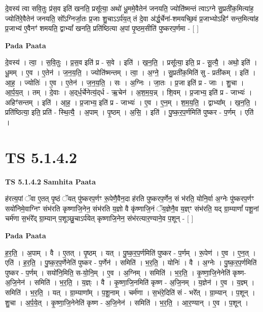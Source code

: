\documentclass[17pt]{extarticle}
\begin{document}
दे॒वस्य॑ त्वा सवि॒तुः प्र॑स॒व इति॑ खनति॒ प्रसू᳚त्या॒ अथो॑ धू॒ममे॒वैतेन॑ जनयति॒ ज्योति॑ष्मन्तं त्वाऽग्ने सु॒प्रती॑क॒मित्या॑ह॒ ज्योति॑रे॒वैतेन॑ जनयति॒ सो᳚ऽग्निर्जा॒तः प्र॒जाः शु॒चाऽऽर्प॑य॒त् तं दे॒वा अ॑र्द्ध॒र्चेना॑-शमयच्छि॒वं प्र॒जाभ्योऽहिꣳ॑ सन्त॒मित्या॑ह प्र॒जाभ्य॑ ए॒वैनꣳ॑ शमयति॒ द्वाभ्यां᳚ खनति॒ प्रति॑ष्ठित्या अ॒पां पृ॒ष्ठम॒सीति॑ पुष्करप॒र्णमा - [  ] \newline

\textbf{Pada Paata} \newline

दे॒वस्य॑ । त्वा॒ । स॒वि॒तुः । प्र॒स॒व इति॑ प्र - स॒वे । इति॑ । ख॒न॒ति॒ । प्रसू᳚त्या॒ इति॒ प्र - सू॒त्यै॒ । अथो॒ इति॑ । धू॒मम् । ए॒व । ए॒तेन॑ । ज॒न॒य॒ति॒ । ज्योति॑ष्मन्तम् । त्वा॒ । अ॒ग्ने॒ । सु॒प्रती॑क॒मिति॑ सु - प्रती॑कम् । इति॑ । आ॒ह॒ । ज्योतिः॑ । ए॒व । ए॒तेन॑ । ज॒न॒य॒ति॒ । सः । अ॒ग्निः । जा॒तः । प्र॒जा इति॑ प्र - जाः । शु॒चा । आ॒र्प॒य॒त् । तम् । दे॒वाः । अ॒द्‌र्ध॒र्चेनेत्य॒॑द्‌र्ध - ऋ॒चेन॑ । अ॒श॒म॒य॒न्न् । शि॒वम् । प्र॒जाभ्य॒ इति॑ प्र - जाभ्यः॑ । अहिꣳ॑सन्तम् । इति॑ । आ॒ह॒ । प्र॒जाभ्य॒ इति॑ प्र - जाभ्यः॑ । ए॒व । ए॒न॒म् । श॒म॒य॒ति॒ । द्वाभ्या᳚म् । ख॒न॒ति॒ । प्रति॑ष्ठित्या॒ इति॒ प्रति॑ - स्थि॒त्यै॒ । अ॒पाम् । पृ॒ष्ठम् । अ॒सि॒ । इति॑ । पु॒ष्क॒र॒प॒र्णमिति॑ पुष्कर - प॒र्णम् । एति॑ ।  \newline




\section*{ TS 5.1.4.2 }

\textbf{TS 5.1.4.2 } \newline
\textbf{Samhita Paata} \newline

ह॑रत्य॒पां ॅवा ए॒तत् पृ॒ष्ठं ॅयत् पु॑ष्करप॒र्णꣳ रू॒पेणै॒वैन॒दा ह॑रति पुष्करप॒र्णेन॒ सं भ॑रति॒ योनि॒र्वा अ॒ग्नेः पु॑ष्करप॒र्णꣳ सयो॑निमे॒वाग्निꣳ संभ॑रति कृष्णाजि॒नेन॒ संभ॑रति य॒ज्ञो वै कृ॑ष्णाजि॒नं ॅय॒ज्ञेनै॒व य॒ज्ञ्ꣳ संभ॑रति॒ यद् ग्रा॒म्याणां᳚ पशू॒नां चर्म॑णा स॒भंरे᳚द् ग्रा॒म्यान् प॒शूञ्छु॒चाऽर्प॑येत् कृष्णाजि॒नेन॒ संभ॑रत्यार॒ण्याने॒व प॒शून् - [  ] \newline

\textbf{Pada Paata} \newline

ह॒र॒ति॒ । अ॒पाम् । वै । ए॒तत् । पृ॒ष्ठम् । यत् । पु॒ष्क॒र॒प॒र्णमिति॑ पुष्कर - प॒र्णम् । रू॒पेण॑ । ए॒व । ए॒न॒त् । एति॑ । ह॒र॒ति॒ । पु॒ष्क॒र॒प॒र्णेनेति॑ पुष्कर - प॒र्णेन॑ । समिति॑ । भ॒र॒ति॒ । योनिः॑ । वै । अ॒ग्नेः । पु॒ष्क॒र॒प॒र्णमिति॑ पुष्कर - प॒र्णम् । सयो॑नि॒मिति॒ स-यो॒नि॒म् । ए॒व । अ॒ग्निम् । समिति॑ । भ॒र॒ति॒ । कृ॒ष्णा॒जि॒नेनेति॑ कृष्ण-अ॒जि॒नेन॑ । समिति॑ । भ॒र॒ति॒ । य॒ज्ञ्ः । वै । कृ॒ष्णा॒जि॒नमिति॑ कृष्ण - अ॒जि॒नम् । य॒ज्ञेन॑ । ए॒व । य॒ज्ञ्म् । समिति॑ । भ॒र॒ति॒ । यत् । ग्रा॒म्याणा᳚म् । प॒शू॒नाम् । चर्म॑णा । स॒भंरे॒दिति॑ सं - भरे᳚त् । ग्रा॒म्यान् । प॒शून् । शु॒चा । अ॒र्प॒ये॒त् । कृ॒ष्णा॒जि॒नेनेति॑ कृष्ण - अ॒जि॒नेन॑ । समिति॑ । भ॒र॒ति॒ । आ॒र॒ण्यान् । ए॒व । प॒शून् ।  \newline
\end{document}
